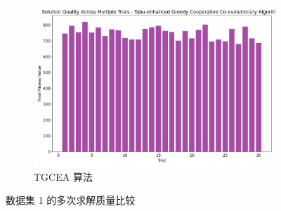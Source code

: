 \documentclass[12pt,a4paper,oneside]{ctexart}
\begin{document}
\begin{appendices}
\begin{figure}[h!]
\begin{subfigure}{0.32\textwidth}
			\includegraphics[width=\textwidth]{fig/26.png}
			\caption{TGCEA 算法}
		\end{subfigure}
		\caption{数据集 1 的多次求解质量比较}
		\label{fig:dataset1_solution_quality}
	\end{figure}



\end{appendices}	
\end{document}
